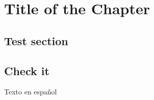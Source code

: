 \documentclass{itmthesis}
\begin{document}
\chapter{Title of the Chapter}
	\section{Test section}
	\begin{figure}

	\end{figure}
	\section{Check it}
Texto en español	
\end{document}
